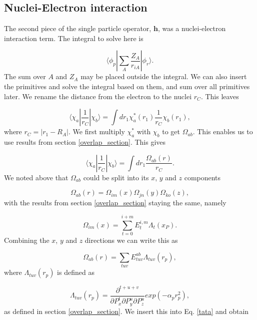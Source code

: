 \documentclass[a4paper,norsk,11pt,twoside]{report}
\begin{document}
\subsection{Nuclei-Electron interaction \label{nuclei-electron-section}}
The second piece of the single particle operator, $\textbf{h}$, was a nuclei-electron interaction term. The integral to solve here is

\begin{equation}
\langle \phi_p | \sum_A \frac{Z_A}{r_{iA}} | \phi_r \rangle .
\end{equation}
The sum over $A$ and $Z_A$ may be placed outside the integral. We can
also insert the primitives and solve the integral based on them, and
sum over all primitives later. We rename the distance from the
electron to the nuclei $r_C$. This leaves

\begin{equation}
\langle \chi_a | \frac{1}{r_{C}} | \chi_b \rangle = \int dr_1 \chi_a^*(r_1) \frac{1}{r_C} \chi_b(r_1)  ,
\end{equation}
where $r_C = |r_1 - R_A|$. We first multiply $\chi_a^*$ with $\chi_b$ to get $\Omega_{ab}$. This enables us to use results from section \ref{overlap_section}. This gives

\begin{equation}
\langle \chi_a | \frac{1}{r_C} | \chi_b \rangle = \int dr_1 \frac{\Omega_{ab}(r)}{r_C} . \label{tata}
\end{equation}
We noted above that $\Omega_{ab}$ could be split into its $x$, $y$ and $z$ components

\begin{equation}
\Omega_{ab}(r) = \Omega_{im}(x) \Omega_{jn}(y) \Omega_{ko}(z) ,
\end{equation}
with the results from section \ref{overlap_section} staying the same, namely

\begin{equation}
\Omega_{im}(x) = \sum_{t = 0}^{i+m} E_t^{i,m} \Lambda_t(x_P) .
\end{equation}
Combining the $x$, $y$ and $z$ directions we can write this as

\begin{equation}
\Omega_{ab}(r) = \sum_{tuv} E_{tuv}^{ab} \Lambda_{tuv}(r_p) ,
\end{equation}
where $\Lambda_{tuv}(r_p)$ is defined as

\begin{equation}
\Lambda_{tuv}(r_p) = \frac{\partial^{t+u+v}}{\partial P_x^t \partial P_y^u \partial P_z^u} exp(-\alpha_p r_p^2) ,
\label{afAFAFA}
\end{equation}
as defined in section \ref{overlap_section}. We insert this into Eq. \eqref{tata} and obtain
\end{document}
